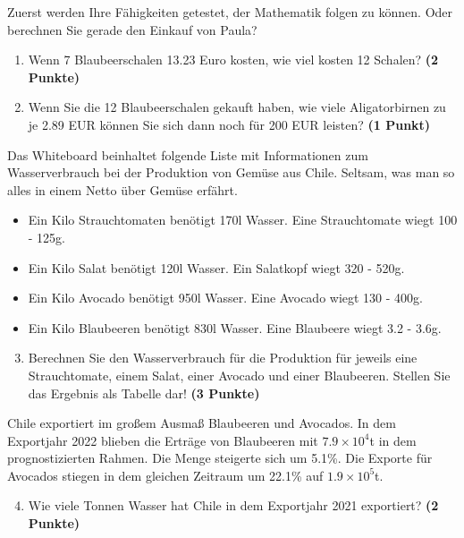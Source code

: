 \documentclass[a4paper, 9pt]{scrartcl}\usepackage[]{graphicx}\usepackage[]{xcolor}
\begin{document}
Zuerst werden Ihre Fähigkeiten getestet, der Mathematik folgen zu können. Oder berechnen Sie gerade den Einkauf von Paula?\\

\begin{enumerate}
\item Wenn 7 Blaubeerschalen 13.23 Euro kosten,  wie viel kosten 12 Schalen? \textbf{(2 Punkte)}
\item Wenn Sie die 12 Blaubeerschalen gekauft haben, wie viele Aligatorbirnen zu je 2.89 EUR können Sie sich dann noch für 200 EUR leisten? \textbf{(1 Punkt)}
\end{enumerate}

Das Whiteboard beinhaltet folgende Liste mit Informationen zum Wasserverbrauch bei der Produktion von Gemüse aus Chile. Seltsam, was man so alles in einem Netto über Gemüse erfährt.
  
\begin{itemize}[noitemsep]
\item Ein Kilo Strauchtomaten benötigt 170l Wasser. Eine Strauchtomate wiegt 100 - 125g.
\item Ein Kilo Salat benötigt 120l Wasser. Ein Salatkopf wiegt 320 - 520g.
\item Ein Kilo Avocado benötigt 950l Wasser. Eine Avocado wiegt 130 - 400g.
\item Ein Kilo Blaubeeren benötigt 830l Wasser. Eine Blaubeere wiegt 3.2 - 3.6g.
\end{itemize}

\begin{enumerate}
  \setcounter{enumi}{2}
\item Berechnen Sie den Wasserverbrauch für die Produktion für jeweils eine Strauchtomate, einem Salat, einer Avocado und einer Blaubeeren. Stellen Sie das Ergebnis als Tabelle dar! \textbf{(3 Punkte)}
\end{enumerate}

Chile exportiert im großem Ausmaß Blaubeeren und Avocados. In dem Exportjahr 2022 blieben die Erträge von Blaubeeren mit \ensuremath{7.9\times 10^{4}}t in dem prognostizierten Rahmen. Die Menge steigerte sich um 5.1\%. Die Exporte für Avocados stiegen in dem gleichen Zeitraum um 22.1\% auf \ensuremath{1.9\times 10^{5}}t.

\begin{enumerate}
  \setcounter{enumi}{3}
\item Wie viele Tonnen Wasser hat Chile in dem Exportjahr 2021 exportiert? \textbf{(2 Punkte)}
\end{enumerate}
\end{document}
